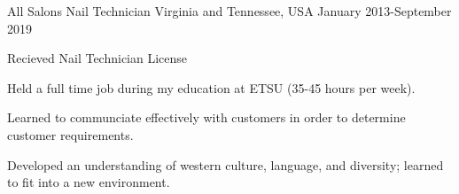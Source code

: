 

\begin{cventries}

  \cventry
    {All Salons} %
    {Nail Technician} %
    {Virginia and Tennessee, USA} %
    {January 2013-September 2019} %
    {
      \begin{cvitems} %
      \item Recieved Nail Technician License
      \item Held a full time job during my education at ETSU (35-45 hours per week).
      \item Learned to communciate effectively with customers in order to determine customer requirements.
      \item Developed an understanding of western culture, language, and diversity; learned to fit into a new environment.
      \end{cvitems}
    }
\end{cventries}
